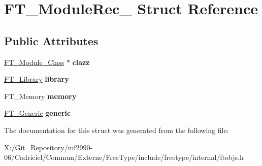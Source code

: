 \hypertarget{struct_f_t___module_rec__}{\section{F\-T\-\_\-\-Module\-Rec\-\_\- Struct Reference}
\label{struct_f_t___module_rec__}
}
\subsection*{Public Attributes}
\begin{DoxyCompactItemize}
\item 
\hypertarget{struct_f_t___module_rec___ac762573dc13af2d2af190a9e855742f5}{\hyperlink{struct_f_t___module___class__}{F\-T\-\_\-\-Module\-\_\-\-Class} $\ast$ {\bfseries clazz}}\label{struct_f_t___module_rec___ac762573dc13af2d2af190a9e855742f5}

\item 
\hypertarget{struct_f_t___module_rec___ac3d04fbdc2988bf9a39f4ad6d3cb4b5f}{\hyperlink{struct_f_t___library_rec__}{F\-T\-\_\-\-Library} {\bfseries library}}\label{struct_f_t___module_rec___ac3d04fbdc2988bf9a39f4ad6d3cb4b5f}

\item 
\hypertarget{struct_f_t___module_rec___a33113e9eb2d6cd8ee6666da75ff8e108}{F\-T\-\_\-\-Memory {\bfseries memory}}\label{struct_f_t___module_rec___a33113e9eb2d6cd8ee6666da75ff8e108}

\item 
\hypertarget{struct_f_t___module_rec___a860be13b9f239c42cacdbc5d6f81d44a}{\hyperlink{struct_f_t___generic__}{F\-T\-\_\-\-Generic} {\bfseries generic}}\label{struct_f_t___module_rec___a860be13b9f239c42cacdbc5d6f81d44a}

\end{DoxyCompactItemize}


The documentation for this struct was generated from the following file\-:\begin{DoxyCompactItemize}
\item 
X\-:/\-Git\-\_\-\-Repository/inf2990-\/06/\-Cadriciel/\-Commun/\-Externe/\-Free\-Type/include/freetype/internal/ftobjs.\-h\end{DoxyCompactItemize}
